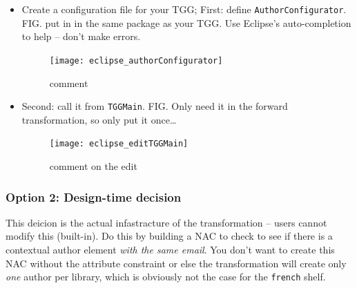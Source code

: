 \begin{itemize}

\item Create a configuration file for your TGG; First: define \texttt{Author\-Config\-ur\-at\-or}. FIG. put in in the same package as your TGG. Use Eclipse's
auto-completion to help -- don't make errors.

\begin{figure}[htbp]
\begin{center}
  \texttt{[image: eclipse\_authorConfigurator]}
  \caption{comment}
  \label{eclipse:authorConfig}
\end{center}
\end{figure}

\clearpage

\item Second: call it from \texttt{TGGMain}. FIG. Only need it in the forward transformation, so only put it once\ldots

\vspace{0.5cm}

\begin{figure}[htbp]
\begin{center}
  \texttt{[image: eclipse\_editTGGMain]}
  \caption{comment on the edit}
  \label{eclipse:editTGGMain}
\end{center}
\end{figure}

\end{itemize}

\subsubsection{Option 2: Design-time decision}

This deicion is the actual infastracture of the transformation -- users cannot modify this (built-in). Do this by building a NAC to check to see if there is a
contextual author element \emph{with the same email}. You don't want to create this NAC without the attribute constraint or else the transformation will create
only \emph{one} author per library, which is obviously not the case for the \texttt{french} shelf.

